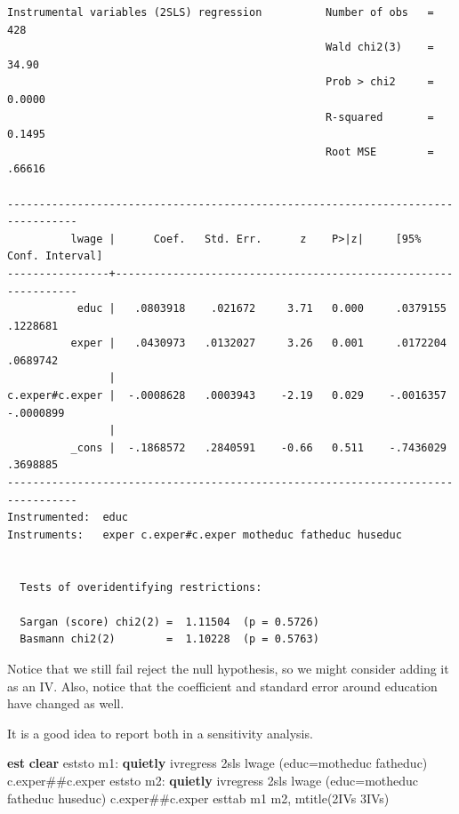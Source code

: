\documentclass[
]{book}
\newenvironment{Shaded}{\begin{snugshade}}{\end{snugshade}}
\newcommand{\KeywordTok}[1]{\textcolor[rgb]{0.13,0.29,0.53}{\textbf{#1}}}
\newcommand{\NormalTok}[1]{#1}
\begin{document}
\begin{verbatim}
Instrumental variables (2SLS) regression          Number of obs   =        428
                                                  Wald chi2(3)    =      34.90
                                                  Prob > chi2     =     0.0000
                                                  R-squared       =     0.1495
                                                  Root MSE        =     .66616

---------------------------------------------------------------------------------
          lwage |      Coef.   Std. Err.      z    P>|z|     [95% Conf. Interval]
----------------+----------------------------------------------------------------
           educ |   .0803918    .021672     3.71   0.000     .0379155    .1228681
          exper |   .0430973   .0132027     3.26   0.001     .0172204    .0689742
                |
c.exper#c.exper |  -.0008628   .0003943    -2.19   0.029    -.0016357   -.0000899
                |
          _cons |  -.1868572   .2840591    -0.66   0.511    -.7436029    .3698885
---------------------------------------------------------------------------------
Instrumented:  educ
Instruments:   exper c.exper#c.exper motheduc fatheduc huseduc


  Tests of overidentifying restrictions:

  Sargan (score) chi2(2) =  1.11504  (p = 0.5726)
  Basmann chi2(2)        =  1.10228  (p = 0.5763)
\end{verbatim}

Notice that we still fail reject the null hypothesis, so we might consider adding it as an IV. Also, notice that the coefficient and standard error around education have changed as well.

It is a good idea to report both in a sensitivity analysis.

\begin{Shaded}
\begin{Highlighting}[]
\KeywordTok{est} \KeywordTok{clear}
\NormalTok{eststo m1: }\KeywordTok{quietly}\NormalTok{ ivregress 2sls lwage (educ=motheduc fatheduc) c.exper\#\#c.exper}
\NormalTok{eststo m2: }\KeywordTok{quietly}\NormalTok{ ivregress 2sls lwage (educ=motheduc fatheduc huseduc) c.exper\#\#c.exper}
\NormalTok{esttab m1 m2, mtitle(2IVs 3IVs)}
\end{Highlighting}
\end{Shaded}
\end{document}
